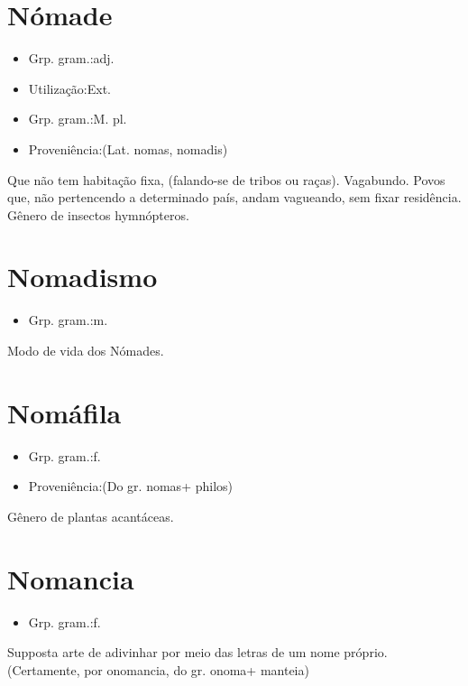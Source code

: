 \section{Nómade}
\begin{itemize}
\item {Grp. gram.:adj.}
\end{itemize}
\begin{itemize}
\item {Utilização:Ext.}
\end{itemize}
\begin{itemize}
\item {Grp. gram.:M. pl.}
\end{itemize}
\begin{itemize}
\item {Proveniência:(Lat. \textunderscore nomas\textunderscore , \textunderscore nomadis\textunderscore )}
\end{itemize}
Que não tem habitação fixa, (falando-se de tribos ou raças).
Vagabundo.
Povos que, não pertencendo a determinado país, andam vagueando, sem fixar residência.
Gênero de insectos hymnópteros.
\section{Nomadismo}
\begin{itemize}
\item {Grp. gram.:m.}
\end{itemize}
Modo de vida dos Nómades.
\section{Nomáfila}
\begin{itemize}
\item {Grp. gram.:f.}
\end{itemize}
\begin{itemize}
\item {Proveniência:(Do gr. \textunderscore nomas\textunderscore  + \textunderscore philos\textunderscore )}
\end{itemize}
Gênero de plantas acantáceas.
\section{Nomancia}
\begin{itemize}
\item {Grp. gram.:f.}
\end{itemize}
Supposta arte de adivinhar por meio das letras de um nome próprio.
(Certamente, por \textunderscore onomancia\textunderscore , do gr. \textunderscore onoma\textunderscore  + \textunderscore manteia\textunderscore )

